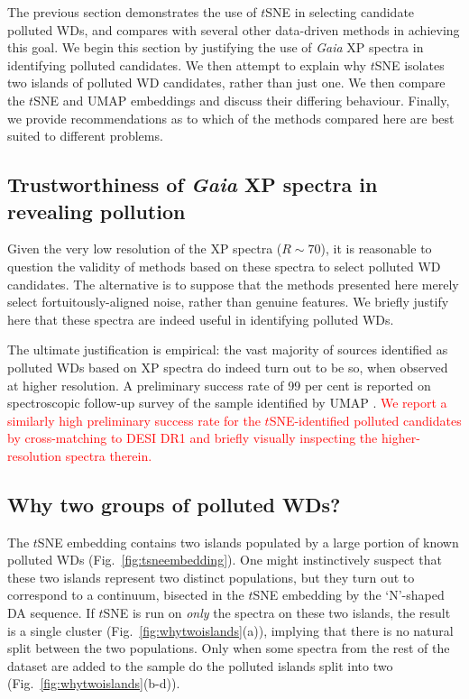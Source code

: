 \documentclass[fleqn,usenatbib]{rasti}
\newcommand{\red}[1]{\textcolor{red}{#1}}
\begin{document}
The previous section demonstrates the use of $t$SNE in selecting candidate polluted WDs, and compares with several other data-driven methods in achieving this goal.
We begin this section by justifying the use of \textit{Gaia} XP spectra in identifying polluted candidates.
We then attempt to explain why $t$SNE isolates two islands of polluted WD candidates, rather than just one.
We then compare the $t$SNE and UMAP embeddings and discuss their differing behaviour.
Finally, we provide recommendations as to which of the methods compared here are best suited to different problems.


\subsection{Trustworthiness of \textit{Gaia} XP spectra in revealing pollution}

Given the very low resolution of the XP spectra ($R\sim 70$), it is reasonable to question the validity of methods based on these spectra to select polluted WD candidates.
The alternative is to suppose that the methods presented here merely select fortuitously-aligned noise, rather than genuine features.
We briefly justify here that these spectra are indeed useful in identifying polluted WDs.

The ultimate justification is empirical: the vast majority of sources identified as polluted WDs based on XP spectra do indeed turn out to be so, when observed at higher resolution.
A preliminary success rate of 99 per cent is reported on spectroscopic follow-up survey of the sample identified by UMAP \citep{kao24}.
\red{
We report a similarly high preliminary success rate for the $t$SNE-identified polluted candidates by cross-matching to DESI DR1 \citep{desidr1} and briefly visually inspecting the higher-resolution spectra therein.
}


\subsection{Why two groups of polluted WDs?}
\label{sec:whytwo}

The $t$SNE embedding contains two islands populated by a large portion of known polluted WDs (Fig.~\ref{fig:tsneembedding}).
One might instinctively suspect that these two islands represent two distinct populations, but they turn out to correspond to a continuum, bisected in the $t$SNE embedding by the `N'-shaped DA sequence.
If $t$SNE is run on \textit{only} the spectra on these two islands, the result is a single cluster (Fig.~\ref{fig:whytwoislands}(a)), implying that there is no natural split between the two populations.
Only when some spectra from the rest of the dataset are added to the sample do the polluted islands split into two (Fig.~\ref{fig:whytwoislands}(b-d)).
\end{document}
